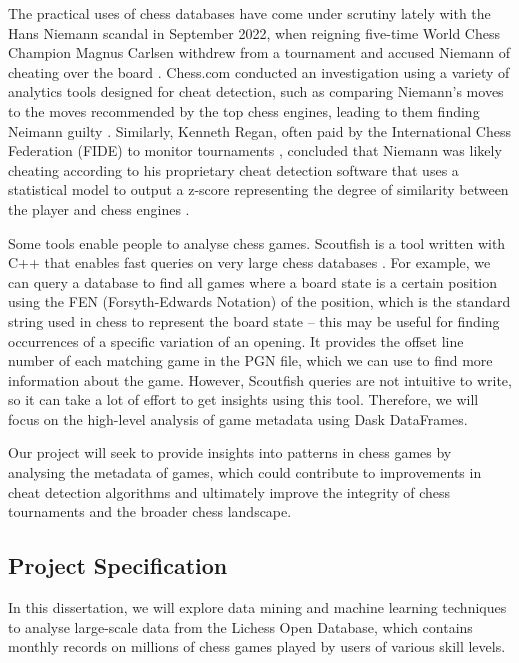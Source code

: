 \documentclass[a4paper, 11pt]{article}
\begin{document}
The practical uses of chess databases have come under scrutiny lately with the Hans Niemann scandal in September 2022, when reigning five-time World Chess Champion Magnus Carlsen withdrew from a tournament and accused Niemann of cheating over the board \cite{niemannCheatingAllegations2}. Chess.com conducted an investigation using a variety of analytics tools designed for cheat detection, such as comparing Niemann's moves to the moves recommended by the top chess engines, leading to them finding Neimann guilty \cite{niemannCheatingChessComReport}. Similarly, Kenneth Regan, often paid by the International Chess Federation (FIDE) to monitor tournaments \cite{niemannCheatingReganReport}, concluded that Niemann was likely cheating according to his proprietary cheat detection software that uses a statistical model to output a z-score representing the degree of similarity between the player and chess engines \cite{niemannCheatingReganReport}.

Some tools enable people to analyse chess games. Scoutfish is a tool written with C++ that enables fast queries on very large chess databases \cite{scoutfish}. For example, we can query a database to find all games where a board state is a certain position using the FEN (Forsyth-Edwards Notation) of the position, which is the standard string used in chess to represent the board state -- this may be useful for finding occurrences of a specific variation of an opening. It provides the offset line number of each matching game in the PGN file, which we can use to find more information about the game. However, Scoutfish queries are not intuitive to write, so it can take a lot of effort to get insights using this tool. Therefore, we will focus on the high-level analysis of game metadata using Dask DataFrames.

Our project will seek to provide insights into patterns in chess games by analysing the metadata of games, which could contribute to improvements in cheat detection algorithms and ultimately improve the integrity of chess tournaments and the broader chess landscape.

\subsection{Project Specification}
In this dissertation, we will explore data mining and machine learning techniques to analyse large-scale data from the Lichess Open Database, which contains monthly records on millions of chess games played by users of various skill levels.
\end{document}
